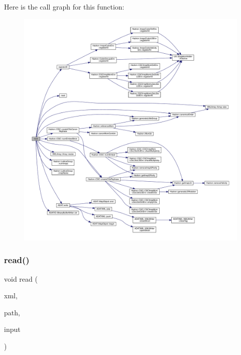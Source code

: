 Here is the call graph for this function\+:
\nopagebreak
\begin{figure}[H]
\begin{center}
\leavevmode
\includegraphics[width=350pt]{d0/d4c/adat-devel_2main_2irreputils_2test__cgs_8cc_a3c04138a5bfe5d72780bb7e82a18e627_cgraph}
\end{center}
\end{figure}
\mbox{\label{adat-devel_2main_2irreputils_2test__cgs_8cc_a0bc6eab6ee4938b14f32a0a933d96dd9}} 
\subsubsection{\texorpdfstring{read()}{read()}}
{\footnotesize\ttfamily void read (\begin{DoxyParamCaption}\item[{X\+M\+L\+Reader \&}]{xml,  }\item[{const string \&}]{path,  }\item[{\mbox{\hyperlink{structtest__cgs__t}{test\+\_\+cgs\+\_\+t}} \&}]{input }\end{DoxyParamCaption})}

